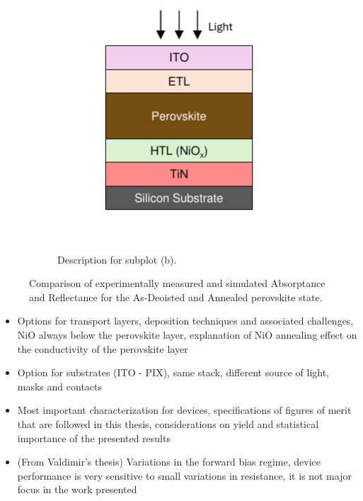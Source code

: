 \begin{figure}[htbp]
\begin{subfigure}[t]{0.49\textwidth}
        \includegraphics[width=\textwidth]{chapters/material_properties/images/PIX_Stack.pdf} %
        \caption{Description for subplot (b).}
        \label{fig:ch2:pix_stack}
    \end{subfigure}

    \caption{Comparison of experimentally measured and simulated Absorptance and Reflectance for the As-Deoisted and Annealed perovskite state.}
    \label{fig:ch2:types_of_stacks}
\end{figure}


\begin{itemize}
    \item Options for transport layers, deposition techniques and associated challenges, NiO always below the perovskite layer, explanation of NiO annealing effect on the conductivity of the perovskite layer
    \item Option for substrates (ITO - PIX), same stack, different source of light, masks and contacts
    \item Most important characterization for devices, specifications of figures of merit that are followed in this thesis, considerations on yield and statistical importance of the presented results
    \item (From Valdimir's thesis) Variations in the forward bias regime, device performance is very sensitive to small variations in resistance, it is not major focus in the work presented
\end{itemize}

